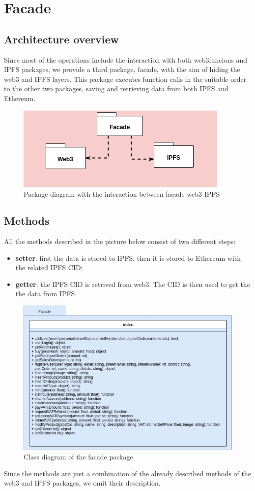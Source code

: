 \section{Facade} 

\subsection{Architecture overview}

Since most of the operations include the interaction with both web3funcions and IPFS packages, we provide a third package, facade, with the aim of hiding the web3 and IPFS layers. This package executes function calls in the suitable order to the other two packages, saving and retrieving data from both IPFS and Ethereum.

\begin{figure}[h]
	\centering
	\includegraphics[scale=0.6]{res/images/facade.png}
	\caption{Package diagram with the interaction between facade-web3-IPFS}
\end{figure}

\subsection{Methods}

All the methods described in the picture below consist of two different steps:
\begin{itemize}
	\item \textbf{setter}: first the data is stored to IPFS, then it is stored to Ethereum with the related IPFS CID;
	\item \textbf{getter}: the IPFS CID is retrived from web3. The CID is then used to get the the data from IPFS. 
\end{itemize}
\begin{figure}[H]
	\centering
	\includegraphics[scale=0.55]{res/images/facade-package.png}
	\caption{Class diagram of the facade package}
\end{figure}

\noindent Since the methods are just a combination of the already described methods of the web3 and IPFS packages, we omit their description.

